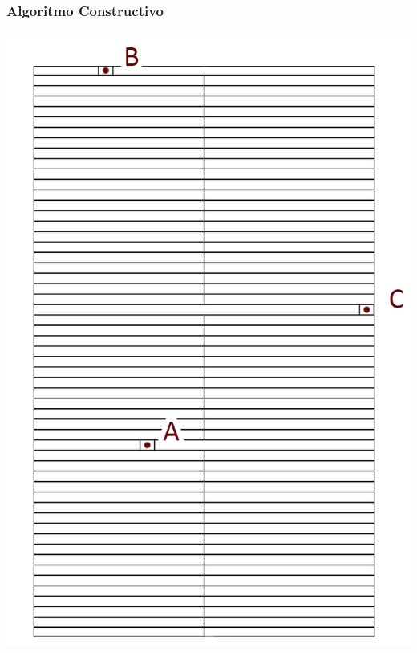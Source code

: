 \begin{frame}
    \frametitle{Algoritmo Constructivo}
    \endblock{}
		\begin{center}
    \includegraphics[height=0.8\textheight]{FIGURES/paso5}
		\end{center}
\end{frame}

